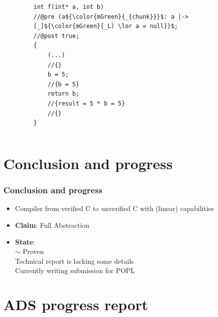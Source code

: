 \documentclass{beamer}
\begin{document}
\begin{frame}[fragile]
\begin{columns}
\begin{column}{0.08\textwidth}
\end{column}

\begin{column}{0.56\textwidth}

\begin{figure}[h]
  \centering
\begin{lstlisting}[style=CStyleNoNum, captionpos = t,title = Source]
int f(int* a, int b)
//@pre (a${\color{mGreen}{_{chunk}}}$: a |-> [_]${\color{mGreen}{_L) \lor a = null}}$;
//@post true;
{
	(...)
	//{}
	b = 5;
	//{b = 5} 
	return b;
	//{result = 5 * b = 5}
	//{}
}
\end{lstlisting}
\end{figure}   

\end{column}
\end{columns}

\end{frame}
\fi
\section{Conclusion and progress}

\begin{frame}
\frametitle{Conclusion and progress}
\begin{itemize}
\item Compiler from verified C to unverified C with (linear) capabilities 
\item \textbf{Claim}: Full Abstraction\\
\item \textbf{State}: \\
\qquad $\sim$ Proven\\
  \qquad\qquad Technical report is lacking some details\\
 \qquad Currently writing submission for POPL\\
\end{itemize}
\end{frame}

\section{ADS progress report}
\end{document}
